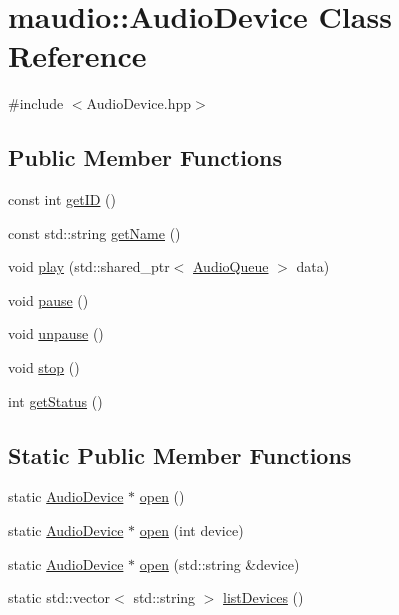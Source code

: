 \hypertarget{classmaudio_1_1AudioDevice}{\section{maudio\-:\-:Audio\-Device Class Reference}
\label{classmaudio_1_1AudioDevice}
}


{\ttfamily \#include $<$Audio\-Device.\-hpp$>$}

\subsection*{Public Member Functions}
\begin{DoxyCompactItemize}
\item 
const int \hyperlink{classmaudio_1_1AudioDevice_a44b7c0cbe6d0139ad0934bbf30538418}{get\-I\-D} ()
\item 
const std\-::string \hyperlink{classmaudio_1_1AudioDevice_a19ac6648a7c059936945db5a9a35f67d}{get\-Name} ()
\item 
void \hyperlink{classmaudio_1_1AudioDevice_aa2367abb2cda0eebd2caf79dced76aa9}{play} (std\-::shared\-\_\-ptr$<$ \hyperlink{classmaudio_1_1AudioQueue}{Audio\-Queue} $>$ data)
\item 
void \hyperlink{classmaudio_1_1AudioDevice_a7633b000390e14423c9cb63888a7d1a3}{pause} ()
\item 
void \hyperlink{classmaudio_1_1AudioDevice_a6730776a14eee6866508ef81d0e45fb4}{unpause} ()
\item 
void \hyperlink{classmaudio_1_1AudioDevice_aeb1e37dfc0c375b8d6732ccb0b3de667}{stop} ()
\item 
int \hyperlink{classmaudio_1_1AudioDevice_af9f763b7fb50350dd31b750fc2ed8f42}{get\-Status} ()
\end{DoxyCompactItemize}
\subsection*{Static Public Member Functions}
\begin{DoxyCompactItemize}
\item 
static \hyperlink{classmaudio_1_1AudioDevice}{Audio\-Device} $\ast$ \hyperlink{classmaudio_1_1AudioDevice_ae2586aef95693bd4585d5394675871b7}{open} ()
\item 
static \hyperlink{classmaudio_1_1AudioDevice}{Audio\-Device} $\ast$ \hyperlink{classmaudio_1_1AudioDevice_a33316f60046e8bb1140b0a1806390f8b}{open} (int device)
\item 
static \hyperlink{classmaudio_1_1AudioDevice}{Audio\-Device} $\ast$ \hyperlink{classmaudio_1_1AudioDevice_a13f3baa0b78421ce9e5524bbb91b7d90}{open} (std\-::string \&device)
\item 
static std\-::vector$<$ std\-::string $>$ \hyperlink{classmaudio_1_1AudioDevice_afcfef078937e7b58007eb1bf6882861a}{list\-Devices} ()
\end{DoxyCompactItemize}


